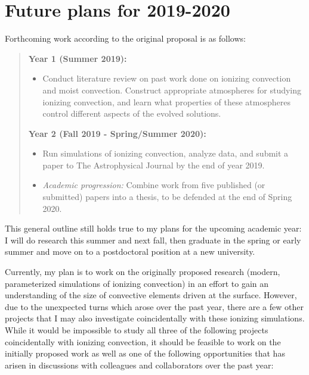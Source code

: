 \documentclass[aasms,12pt]{article}
\begin{document}
\section{Future plans for 2019-2020}
\label{sec:future_plans}
Forthcoming work according to the original proposal is as follows:

\begin{quote}
\textbf{Year 1 (Summer 2019):}
\begin{itemize}
\item Conduct literature review on past work done on ionizing convection and moist convection.
Construct appropriate atmospheres for studying ionizing convection, and learn what properties of
these atmospheres control different aspects of the evolved solutions.
\end{itemize}

\vspace{-0.2cm}
\noindent
\textbf{Year 2 (Fall 2019 - Spring/Summer 2020):}
\begin{itemize}
\vspace{-0.2cm}
\item Run simulations of ionizing convection, analyze data, and submit a paper to The
Astrophysical Journal by the end of year 2019.
\vspace{-0.2cm}
\item \emph{Academic progression:} Combine work from five published (or submitted) papers into a thesis, to be defended at the end of 
Spring 2020.
\end{itemize}
\end{quote}

This general outline still holds true to my plans for the upcoming academic year: I will
do research this summer and next fall, then graduate in the spring or early summer and 
move on to a postdoctoral position at a new university.

Currently, my plan is to work on the originally proposed research (modern, parameterized simulations
of ionizing convection) in an effort to gain an understanding of the size of convective elements
driven at the surface. However, due to the unexpected turns which arose over the past year,
there are a few other projects that I may also investigate coincidentally with these
ionizing simulations.  While it would be impossible to study all three of the following
projects coincidentally with ionizing convection, 
it should be feasible to work on the initially
proposed work as well as one of the following opportunities that has arisen in discussions
with colleagues and collaborators over the past year:
\end{document}
